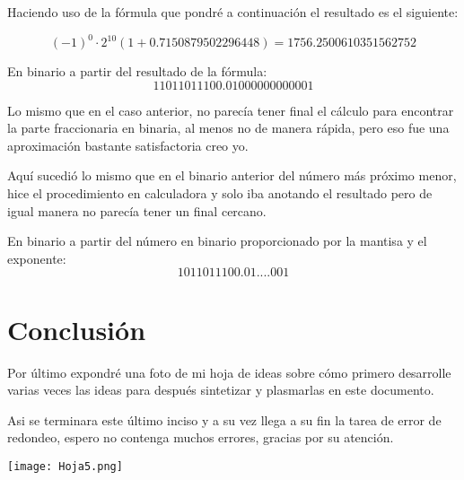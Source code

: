 \documentclass{article}
\begin{document}
Haciendo uso de la fórmula que pondré a continuación el resultado es el siguiente:

$$(- 1)^0\cdot2^{10}(1 + 0. 7150879502296448) = 1756. 2500610351562752$$

En binario a partir del resultado de la fórmula:
$$11011011100. 01000000000001$$

Lo mismo que en el caso anterior, no parecía tener final el cálculo para encontrar la
parte fraccionaria en binaria, al menos no de manera rápida, pero eso fue una
aproximación bastante satisfactoria creo yo.

Aquí sucedió lo mismo que en el binario anterior del número más próximo menor,
hice el procedimiento en calculadora y solo iba anotando el resultado pero de igual
manera no parecía tener un final cercano.

En binario a partir del número en binario proporcionado por la mantisa y el
exponente:
$$1011011100. 01.... 001$$

\section{Conclusión}
Por último expondré una foto de mi hoja de ideas sobre cómo primero desarrolle
varias veces las ideas para después sintetizar y plasmarlas en este documento.

Asi se terminara este último inciso y a su vez
llega a su fin la tarea de error de redondeo,
espero no contenga muchos errores, gracias
por su atención.

\texttt{[image: Hoja5.png]}




\end{document}
